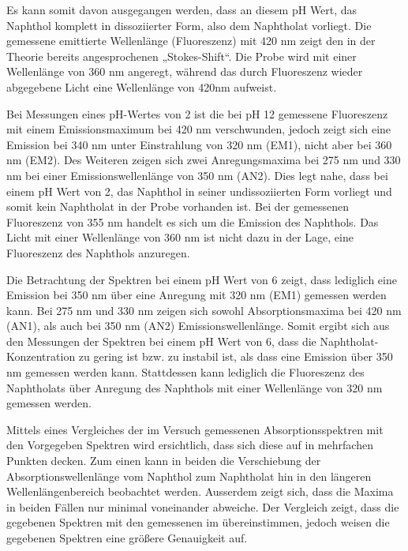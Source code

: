\documentclass[12pt]{article}
\begin{document}
Es kann somit davon ausgegangen werden, dass an diesem pH Wert, das Naphthol komplett in dissoziierter Form, also dem Naphtholat vorliegt.
Die gemessene emittierte Wellenlänge (Fluoreszenz) mit 420 nm zeigt den in der Theorie bereits angesprochenen „Stokes-Shift“.
 Die Probe wird mit einer Wellenlänge von 360 nm angeregt, während das durch Fluoreszenz wieder abgegebene
 Licht eine Wellenlänge von 420nm aufweist.


Bei Messungen eines pH-Wertes von 2 ist die bei pH 12 gemessene Fluoreszenz mit einem Emissionsmaximum bei 420 nm verschwunden,
jedoch zeigt sich eine Emission bei 340 nm unter Einstrahlung von 320 nm (EM1), nicht aber bei 360 nm (EM2).
 Des Weiteren zeigen sich zwei Anregungsmaxima bei 275 nm und 330 nm bei einer Emissionswellenlänge von 350 nm (AN2).
Dies legt nahe, dass bei einem pH Wert von 2, das Naphthol in seiner undissoziierten Form vorliegt
und somit kein Naphtholat in der Probe vorhanden ist. Bei der gemessenen Fluoreszenz von 355 nm handelt
es sich um die Emission des Naphthols. Das Licht mit einer Wellenlänge von 360 nm ist nicht dazu in der Lage,
 eine Fluoreszenz des Naphthols anzuregen.


Die Betrachtung der Spektren bei einem pH Wert von 6 zeigt, dass lediglich eine Emission bei 350 nm
 über eine Anregung mit 320 nm (EM1) gemessen werden kann. Bei 275 nm und 330 nm zeigen sich sowohl Absorptionsmaxima bei 420 nm (AN1),
  als auch bei 350 nm (AN2) Emissionswellenlänge.
Somit ergibt sich aus den Messungen der Spektren bei einem pH Wert von 6,
dass die Naphtholat-Konzentration zu gering ist bzw. zu instabil ist,
als dass eine Emission über 350 nm gemessen werden kann.
Stattdessen kann lediglich die Fluoreszenz des Naphtholats
über Anregung des Naphthols mit einer Wellenlänge von 320 nm gemessen werden.


Mittels eines Vergleiches der im Versuch gemessenen Absorptionsspektren mit den Vorgegeben Spektren wird ersichtlich,
dass sich diese auf in mehrfachen Punkten decken. Zum einen kann in beiden die Verschiebung der Absorptionswellenlänge
 vom Naphthol zum Naphtholat hin in den längeren Wellenlängenbereich beobachtet werden. Ausserdem zeigt sich,
  dass die Maxima in beiden Fällen nur minimal voneinander abweiche.
Der Vergleich zeigt, dass die gegebenen Spektren mit den gemessenen im übereinstimmen,
jedoch weisen die gegebenen Spektren eine größere Genauigkeit auf.

\printbibliography
\end{document}
